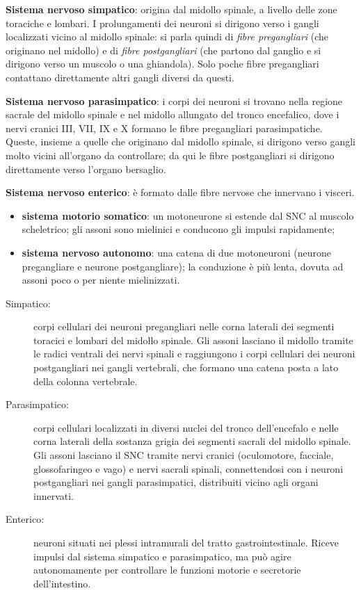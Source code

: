\textbf{Sistema nervoso simpatico}: origina dal midollo spinale, a livello
delle zone toraciche e lombari. I prolungamenti dei neuroni si dirigono
verso i gangli localizzati vicino al midollo spinale: si parla quindi di
\textit{fibre pregangliari} (che originano nel midollo) e di \textit{fibre
postgangliari} (che partono dal ganglio e si dirigono verso un muscolo o
una ghiandola). Solo poche fibre pregangliari contattano direttamente altri
gangli diversi da questi.

\textbf{Sistema nervoso parasimpatico}: i corpi dei neuroni si trovano
nella regione sacrale del midollo spinale e nel midollo allungato del
tronco encefalico, dove i nervi cranici III, VII, IX e X formano le fibre
pregangliari parasimpatiche. Queste, insieme a quelle che originano dal
midollo spinale, si dirigono verso gangli molto vicini all'organo da
controllare; da qui le fibre postgangliari si dirigono direttamente verso
l'organo bersaglio.

\textbf{Sistema nervoso enterico}: è formato dalle fibre nervose che
innervano i visceri.

\begin{itemize}
  \item \textbf{sistema motorio somatico}: un motoneurone si estende dal
    SNC al muscolo scheletrico; gli assoni sono mielinici e conducono gli
    impulsi rapidamente;
  \item \textbf{sistema nervoso autonomo}: una catena di due motoneuroni
    (neurone pregangliare e neurone postgangliare); la conduzione è più
    lenta, dovuta ad assoni poco o per niente mielinizzati.
\end{itemize}

\begin{description}
  \item[Simpatico:] corpi cellulari dei neuroni pregangliari nelle corna
    laterali dei segmenti toracici e lombari del midollo spinale. Gli
    assoni lasciano il midollo tramite le radici ventrali dei nervi
    spinali e raggiungono i corpi cellulari dei neuroni postgangliari nei
    gangli vertebrali, che formano una catena posta a lato della colonna
    vertebrale.
  \item[Parasimpatico:] corpi cellulari localizzati in diversi nuclei del
    tronco dell'encefalo e nelle corna laterali della sostanza grigia dei
    segmenti sacrali del midollo spinale. Gli assoni lasciano il SNC
    tramite nervi cranici (oculomotore, facciale, glossofaringeo e vago) e
    nervi sacrali spinali, connettendosi con i neuroni postgangliari nei
    gangli parasimpatici, distribuiti vicino agli organi innervati.
  \item[Enterico:] neuroni situati nei plessi intramurali del tratto
    gastrointestinale. Riceve impulsi dal sistema simpatico e
    parasimpatico, ma può agire autonomamente per controllare le funzioni
    motorie e secretorie dell'intestino.
\end{description}

